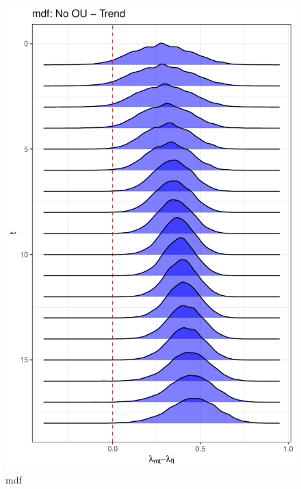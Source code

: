 \documentclass[
  12pt,
]{article}
\begin{document}
\begin{figure}

{\centering \includegraphics[width=0.9\linewidth]{../Figures/mdf/lambda_diff} 

}

\caption{mdf}\label{fig:unnamed-chunk-16}
\end{figure}
\end{document}
